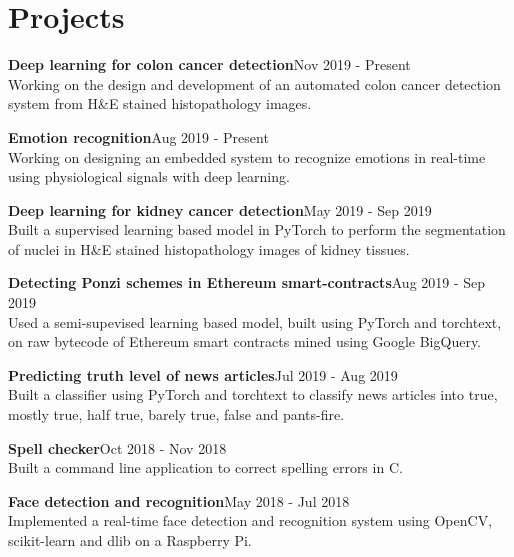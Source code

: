 \documentclass[letterpaper]{article}
\renewenvironment{itemize}{
  \begin{list}{}{
    \setlength{\leftmargin}{1.5em}
  }
}{
  \end{list}
}
\begin{document}
\section*{Projects}
  \begin{itemize}
    \item
    \textbf{Deep learning for colon cancer detection}\hfill{\textcolor{black!80}{\small{Nov 2019 - Present}}}\\
    Working on the design and development of an automated colon cancer detection system from H\&E stained histopathology images.

    \item
    \textbf{Emotion recognition}\hfill{\textcolor{black!80}{\small{Aug 2019 - Present}}}\\
    Working on designing an embedded system to recognize emotions in real-time using physiological signals with deep learning.

    \item
    \textbf{Deep learning for kidney cancer detection}\hfill{\textcolor{black!80}{\small{May 2019 - Sep 2019}}}\\
    Built a supervised learning based model in PyTorch to perform the segmentation of nuclei in H\&E stained histopathology images of kidney tissues.

    \item
    \textbf{Detecting Ponzi schemes in Ethereum smart-contracts}\hfill{\textcolor{black!80}{\small{Aug 2019 - Sep 2019}}}\\
    Used a semi-supevised learning based model, built using PyTorch and torchtext, on raw bytecode of Ethereum smart contracts mined using Google BigQuery.

    \item
    \textbf{Predicting truth level of news articles}\hfill{\textcolor{black!80}{\small{Jul 2019 - Aug 2019}}}\\
    Built a classifier using PyTorch and torchtext to classify news articles into true, mostly true, half true, barely true, false and pants-fire.

    \item
    \textbf{Spell checker}\hfill{\textcolor{black!80}{\small{Oct 2018 - Nov 2018}}}\\
    Built a command line application to correct spelling errors in C.

    \item
    \textbf{Face detection and recognition}\hfill{\textcolor{black!80}{\small{May 20}18 - Jul 2018}}\\
    Implemented a real-time face detection and recognition system using OpenCV, scikit-learn and dlib on a Raspberry Pi.

  \end{itemize}
\end{document}
